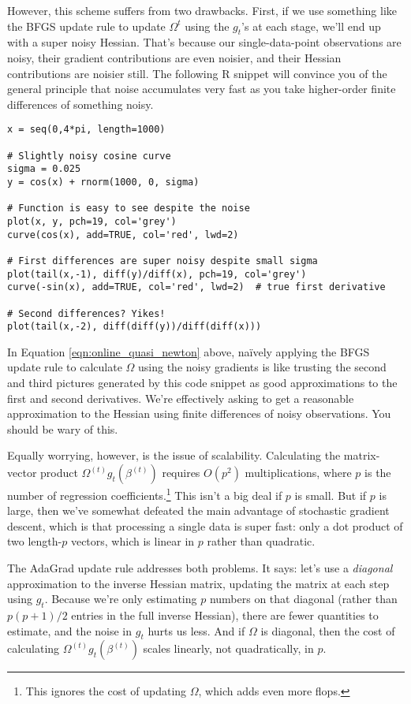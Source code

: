 \documentclass{article}
\begin{document}
\begin{enumerate}[(A)]
However, this scheme suffers from two drawbacks.  First, if we use something like the BFGS update rule to update $\Omega^t$ using the $g_t$'s at each stage, we'll end up with a super noisy Hessian.  That's because our single-data-point observations are noisy, their gradient contributions are even noisier, and their Hessian contributions are noisier still.  The following R snippet will convince you of the general principle that noise accumulates very fast as you take higher-order finite differences of something noisy.
\begin{verbatim}
x = seq(0,4*pi, length=1000)

# Slightly noisy cosine curve
sigma = 0.025
y = cos(x) + rnorm(1000, 0, sigma)

# Function is easy to see despite the noise
plot(x, y, pch=19, col='grey')
curve(cos(x), add=TRUE, col='red', lwd=2)

# First differences are super noisy despite small sigma
plot(tail(x,-1), diff(y)/diff(x), pch=19, col='grey')
curve(-sin(x), add=TRUE, col='red', lwd=2)  # true first derivative

# Second differences? Yikes!
plot(tail(x,-2), diff(diff(y))/diff(diff(x)))
\end{verbatim}
In Equation \ref{eqn:online_quasi_newton} above, na\"ively applying the BFGS update rule to calculate $\Omega$ using the noisy gradients is like trusting the second and third pictures generated by this code snippet as good approximations to the first and second derivatives.  We're effectively asking to get a reasonable approximation to the Hessian using finite differences of noisy observations.  You should be wary of this.

Equally worrying, however, is the issue of scalability.  Calculating the matrix-vector product $\Omega^{(t)} g_t(\beta^{(t)})$ requires $O(p^2)$ multiplications, where $p$ is the number of regression coefficients.\footnote{This ignores the cost of updating $\Omega$, which adds even more flops.}  This isn't a big deal if $p$ is small.  But if $p$ is large, then we've somewhat defeated the main advantage of stochastic gradient descent, which is that processing a single data is super fast: only a dot product of two length-$p$ vectors, which is linear in $p$ rather than quadratic.

The AdaGrad update rule addresses both problems.  It says: let's use a \textit{diagonal} approximation to the inverse Hessian matrix, updating the matrix at each step using $g_t$.  Because we're only estimating $p$ numbers on that diagonal (rather than $p(p+1)/2$ entries in the full inverse Hessian), there are fewer quantities to estimate, and the noise in $g_t$ hurts us less.  And if $\Omega$ is diagonal, then the cost of calculating $\Omega^{(t)} g_t(\beta^{(t)})$ scales linearly, not quadratically, in $p$.


\end{enumerate}
\end{document}
